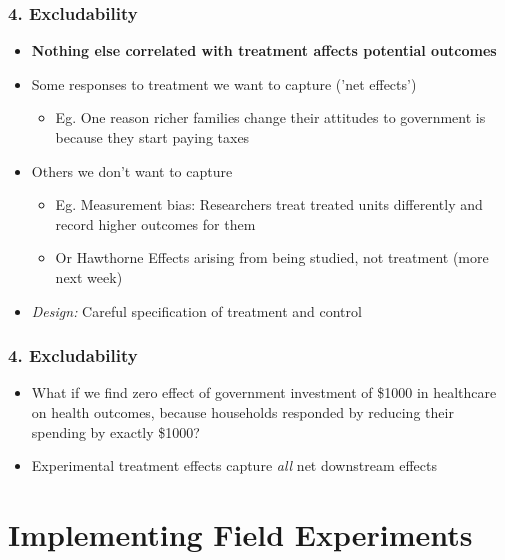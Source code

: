 \documentclass[xcolor=x11names,compress]{beamer}\usepackage[]{graphicx}\usepackage[]{color}
\renewcommand{\(}{\begin{columns}}
\renewcommand{\)}{\end{columns}}
\newcommand{\<}[1]{\begin{column}{#1}}
\renewcommand{\>}{\end{column}}
\begin{document}
\begin{frame}
\frametitle{4. Excludability}
\begin{itemize}
\item \textbf{Nothing else correlated with treatment affects potential outcomes}
\pause
\item Some responses to treatment we want to capture ('net effects')
\begin{itemize}
\item Eg. One reason richer families change their attitudes to government is because they start paying taxes
\end{itemize}
\pause
\item Others we don't want to capture
\begin{itemize}
\item Eg. Measurement bias: Researchers treat treated units differently and record higher outcomes for them
\pause
\item Or Hawthorne Effects arising from being studied, not treatment (more next week)
\end{itemize}
\item \textit{Design:} Careful specification of treatment and control
\end{itemize}
\end{frame}

\begin{frame}
\frametitle{4. Excludability}
\begin{itemize}
\item What if we find zero effect of government investment of \$1000 in healthcare on health outcomes, because households responded by reducing their spending by exactly \$1000?
\pause
\item Experimental treatment effects capture \textit{all} net downstream effects
\end{itemize}
\end{frame}

\section{Implementing Field Experiments}
\end{document}
